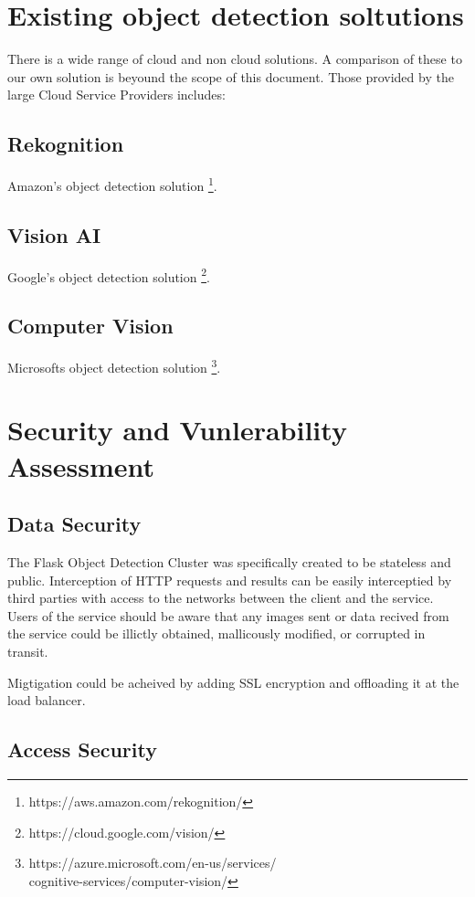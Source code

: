 \documentclass[conference]{IEEEtran}
\begin{document}
\section{Existing object detection soltutions}
There is a wide range of cloud and non cloud solutions. A comparison of these to our own solution is beyound the scope of this document. Those provided by the large Cloud Service Providers includes:
\subsection{Rekognition}
Amazon's object detection solution \footnote{https://aws.amazon.com/rekognition/}.
\subsection{Vision AI}
Google's object detection solution \footnote{https://cloud.google.com/vision/}.
\subsection{Computer Vision}
Microsofts object detection solution \footnote{https://azure.microsoft.com/en-us/services/\\cognitive-services/computer-vision/}.

\section{Security and Vunlerability Assessment}
\subsection{Data Security}
The Flask Object Detection Cluster was specifically created to be stateless and public. Interception of HTTP requests and results can be easily interceptied by third parties with access to the networks between the client and the service. Users of the service should be aware that any images sent or data recived from the service could be illictly obtained, mallicously modified, or corrupted in transit. \par
Migtigation could be acheived by adding SSL encryption and offloading it at the load balancer.
\subsection{Access Security}
\end{document}
